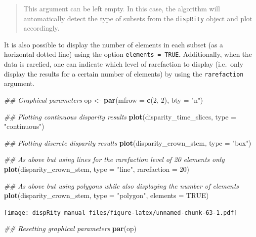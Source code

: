 \documentclass[]{book}
\newenvironment{Shaded}{\begin{snugshade}}{\end{snugshade}}
\newcommand{\CommentTok}[1]{\textcolor[rgb]{0.56,0.35,0.01}{\textit{#1}}}
\newcommand{\DataTypeTok}[1]{\textcolor[rgb]{0.13,0.29,0.53}{#1}}
\newcommand{\DecValTok}[1]{\textcolor[rgb]{0.00,0.00,0.81}{#1}}
\newcommand{\KeywordTok}[1]{\textcolor[rgb]{0.13,0.29,0.53}{\textbf{#1}}}
\newcommand{\NormalTok}[1]{#1}
\newcommand{\OtherTok}[1]{\textcolor[rgb]{0.56,0.35,0.01}{#1}}
\newcommand{\StringTok}[1]{\textcolor[rgb]{0.31,0.60,0.02}{#1}}
\begin{document}
\begin{quote}
This argument can be left empty. In this case, the algorithm will automatically detect the type of subsets from the \texttt{dispRity} object and plot accordingly.
\end{quote}

It is also possible to display the number of elements in each subset (as a horizontal dotted line) using the option \texttt{elements\ =\ TRUE}.
Additionally, when the data is rarefied, one can indicate which level of rarefaction to display (i.e.~only display the results for a certain number of elements) by using the \texttt{rarefaction} argument.

\begin{Shaded}
\begin{Highlighting}[]
\CommentTok{## Graphical parameters}
\NormalTok{op <-}\StringTok{ }\KeywordTok{par}\NormalTok{(}\DataTypeTok{mfrow =} \KeywordTok{c}\NormalTok{(}\DecValTok{2}\NormalTok{, }\DecValTok{2}\NormalTok{), }\DataTypeTok{bty =} \StringTok{"n"}\NormalTok{)}

\CommentTok{## Plotting continuous disparity results}
\KeywordTok{plot}\NormalTok{(disparity_time_slices, }\DataTypeTok{type =} \StringTok{"continuous"}\NormalTok{)}

\CommentTok{## Plotting discrete disparity results}
\KeywordTok{plot}\NormalTok{(disparity_crown_stem, }\DataTypeTok{type =} \StringTok{"box"}\NormalTok{)}

\CommentTok{## As above but using lines for the rarefaction level of 20 elements only}
\KeywordTok{plot}\NormalTok{(disparity_crown_stem, }\DataTypeTok{type =} \StringTok{"line"}\NormalTok{, }\DataTypeTok{rarefaction =} \DecValTok{20}\NormalTok{)}

\CommentTok{## As above but using polygons while also displaying the number of elements}
\KeywordTok{plot}\NormalTok{(disparity_crown_stem, }\DataTypeTok{type =} \StringTok{"polygon"}\NormalTok{, }\DataTypeTok{elements =} \OtherTok{TRUE}\NormalTok{)}
\end{Highlighting}
\end{Shaded}

\texttt{[image: dispRity\_manual\_files/figure-latex/unnamed-chunk-63-1.pdf]}

\begin{Shaded}
\begin{Highlighting}[]
\CommentTok{## Resetting graphical parameters}
\KeywordTok{par}\NormalTok{(op)}
\end{Highlighting}
\end{Shaded}
\end{document}
